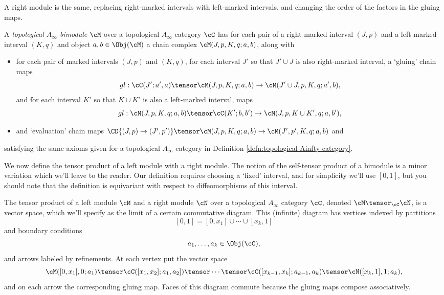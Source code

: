 A right module is the same, replacing right-marked intervals with left-marked intervals, and changing the order of the factors in the gluing maps.

\begin{defn}
\label{defn:topological-Ainfty-bimodule}%
A \emph{topological $A_\infty$ bimodule} $\cM$ over a topological $A_\infty$ category $\cC$ has for each pair of a right-marked interval $(J,p)$ and a left-marked interval $(K,q)$ and object $a,b \in \Obj(\cM)$ a chain complex $\cM(J,p,K,q; a,b)$, along with
\begin{itemize}
\item for each pair of marked intervals $(J,p)$ and $(K,q)$, for each interval $J'$ so that $J' \cup J$ is also right-marked interval, a `gluing' chain maps
$$gl: \cC(J';a',a) \tensor \cM(J,p,K,q;a,b) \to \cM(J' \cup J,p,K,q;a',b),$$
and for each interval $K'$ so that $K \cup K'$ is also a left-marked interval, maps
$$gl: \cM(J,p,K,q;a,b) \tensor \cC(K';b,b') \to \cM(J,p,K \cup K',q;a,b'),$$
\item and `evaluation' chain maps $\CD{(J,p) \to (J',p')} \tensor \cM(J,p,K,q;a,b) \to \cM(J',p',K,q;a,b)$ and 
\end{itemize}
satisfying the same axioms given for a topological $A_\infty$ category in Definition \ref{defn:topological-Ainfty-category}.
\end{defn}

We now define the tensor product of a left module with a right module. The notion of the self-tensor product of a bimodule is a minor variation which we'll leave to the reader.
Our definition requires choosing a `fixed' interval, and for simplicity we'll use $[0,1]$, but you should note that the definition is equivariant with respect to diffeomorphisms of this interval.

\begin{defn}
The tensor product of a left module $\cM$ and a right module $\cN$ over a topological $A_\infty$ category $\cC$, denoted $\cM \tensor_{\cC} \cN$, is a vector space, which we'll specify as the limit of a certain commutative diagram. This (infinite) diagram has vertices indexed by partitions $$[0,1] = [0,x_1] \cup \cdots \cup [x_k,1]$$ and boundary conditions $$a_1, \ldots, a_k \in \Obj(\cC),$$ and arrows labeled by refinements. At each vertex put the vector space $$\cM([0,x_1],0; a_1) \tensor \cC([x_1,x_2];a_1,a_2]) \tensor \cdots \tensor \cC([x_{k-1},x_k];a_{k-1},a_k) \tensor \cN([x_k,1],1;a_k),$$ and on each arrow the corresponding gluing map. Faces of this diagram commute because the gluing maps compose associatively.
\end{defn}

